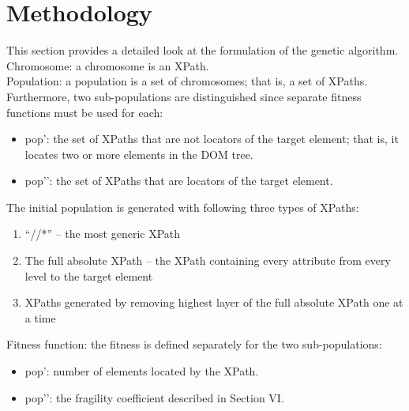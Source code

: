 \documentclass[format=acmlarge, nonacm=true]{acmart}
\begin{document}
\section{Methodology}
This section provides a detailed look at the formulation of the genetic algorithm.
Chromosome: a chromosome is an XPath.\\
Population: a population is a set of chromosomes; that is, a set of XPaths. Furthermore, two sub-populations are distinguished since separate fitness functions must be used for each:\\
\begin{itemize}
\item pop’: the set of XPaths that are not locators of the target element; that is, it locates two or more elements in the DOM tree.
\item pop’’: the set of XPaths that are locators of the target element.
\end{itemize}
The initial population is generated with following three types of XPaths:\\
\begin{enumerate}
	\item “//*” – the most generic XPath
	\item The full absolute XPath – the XPath containing every attribute from every level to the target element
	\item XPaths generated by removing highest layer of the full absolute XPath one at a time
\end{enumerate}
Fitness function: the fitness is defined separately for the two sub-populations:\\
\begin{itemize}
	\item pop’: number of elements located by the XPath.
	\item pop’’: the fragility coefficient described in Section VI.
\end{itemize}
\end{document}

